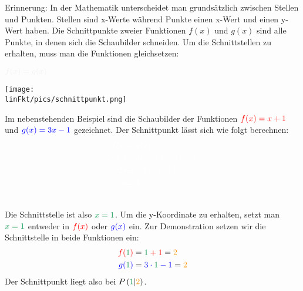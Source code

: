 Erinnerung: In der Mathematik unterscheidet man grundsätzlich zwischen Stellen und Punkten. Stellen sind x-Werte während Punkte einen x-Wert und einen y-Wert haben. Die Schnittpunkte zweier Funktionen $f(x)$ und $g(x)$ sind alle Punkte, in denen sich die Schaubilder schneiden. Um die Schnittstellen zu erhalten, muss man die Funktionen gleichsetzen:
\begin{tcolorbox}\centering
	$\textcolor{loestc}{f(x)=g(x)}$
\end{tcolorbox}
\begin{minipage}{0.49\textwidth}
	\texttt{[image: \\linFkt/pics/schnittpunkt.png]}
\end{minipage}
\begin{minipage}{0.49\textwidth}
	Im nebenstehenden Beispiel sind die Schaubilder der Funktionen $\textcolor{red}{f(x)=x+1}$ und $\textcolor{blue}{g(x)=3x-1}$ gezeichnet. Der Schnittpunkt lässt sich wie folgt berechnen:
	\begin{align*}
		\textcolor{loes}{f(x)}&\textcolor{loes}{=g(x)}\\
		\textcolor{loes}{x+1}&\textcolor{loes}{=3x-1\ \vert -3x-1}\\
		\textcolor{loes}{-2x}&\textcolor{loes}{=-2\ \vert \cdot\left(-\tfrac{1}{2}\right)}\\
		\textcolor{loes}{x}&\textcolor{loes}{=1}
	\end{align*}
\end{minipage}\smallskip\\
Die Schnittstelle ist also $\textcolor{ForestGreen}{x=1}$. Um die y-Koordinate zu erhalten, setzt man $\textcolor{ForestGreen}{x=1}$ entweder in $\textcolor{red}{f(x)}$ oder $\textcolor{blue}{g(x)}$ ein. Zur Demonstration setzen wir die Schnittstelle in beide Funktionen ein:
\begin{align*}
	\textcolor{red}{f(}\textcolor{ForestGreen}{1}\textcolor{red}{)}&=\textcolor{red}{\textcolor{ForestGreen}{1}+1}=\textcolor{YellowOrange}{2}\\
	\textcolor{blue}{g(}\textcolor{ForestGreen}{1}\textcolor{blue}{)}&=\textcolor{blue}{3\cdot \textcolor{ForestGreen}{1}-1}=\textcolor{YellowOrange}{2}
\end{align*}
Der Schnittpunkt liegt also bei $P\left(\textcolor{ForestGreen}{1}\lvert\textcolor{YellowOrange}{2}\right)$.
